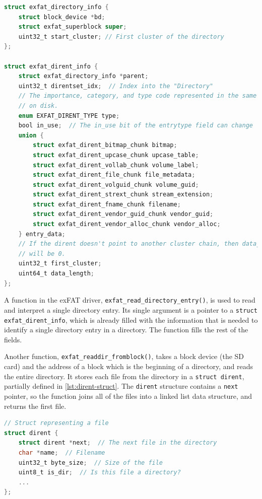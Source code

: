 \documentclass{article}
\begin{document}
\begin{lstlisting}[language=C, caption={The structures which describe
                   directories and directory entries on an exFAT volume},
                   float, label={lst:exfat-dirent-structs}]
struct exfat_directory_info {
    struct block_device *bd;
    struct exfat_superblock super;
    uint32_t start_cluster; // First cluster of the directory
};

struct exfat_dirent_info {
    struct exfat_directory_info *parent;
    uint32_t direntset_idx;  // Index into the "Directory"
    // The importance, category, and type code represented in the same way as
    // on disk.
    enum EXFAT_DIRENT_TYPE type;
    bool in_use;  // The in_use bit of the entrytype field can change
    union {
        struct exfat_dirent_bitmap_chunk bitmap;
        struct exfat_dirent_upcase_chunk upcase_table;
        struct exfat_dirent_vollab_chunk volume_label;
        struct exfat_dirent_file_chunk file_metadata;
        struct exfat_dirent_volguid_chunk volume_guid;
        struct exfat_dirent_strext_chunk stream_extension;
        struct exfat_dirent_fname_chunk filename;
        struct exfat_dirent_vendor_guid_chunk vendor_guid;
        struct exfat_dirent_vendor_alloc_chunk vendor_alloc;
    } entry_data;
    // If the dirent doesn't point to another cluster chain, then data_length
    // will be 0.
    uint32_t first_cluster;
    uint64_t data_length;
};
\end{lstlisting}

A function in the exFAT driver, \verb!exfat_read_directory_entry()!, is used to
read and interpret a single directory entry. Its single argument is a pointer
to a \verb!struct exfat_dirent_info!, which is already filled with the
information that is needed to identify a single directory entry in a directory.
The function fills the rest of the fields.

Another function, \verb!exfat_readdir_fromblock()!, takes a block device (the
SD card) and the address of a block which is the beginning of a directory, and
reads the entire directory. It stores each file from the directory in a
\verb!struct dirent!, partially defined in \autoref{lst:dirent-struct}. The
\verb!dirent! structure contains a \verb!next! pointer, so the function joins
all of the files into a linked list data structure, and returns the first file.

\begin{lstlisting}[language=C, caption={The dirent struct, which stores
                   information about files}, float, label={lst:dirent-struct}]
// Struct representing a file
struct dirent {
    struct dirent *next;  // The next file in the directory
    char *name;  // Filename
    uint32_t byte_size;  // Size of the file
    uint8_t is_dir;  // Is this file a directory?
    ...
};
\end{lstlisting}
\end{document}

